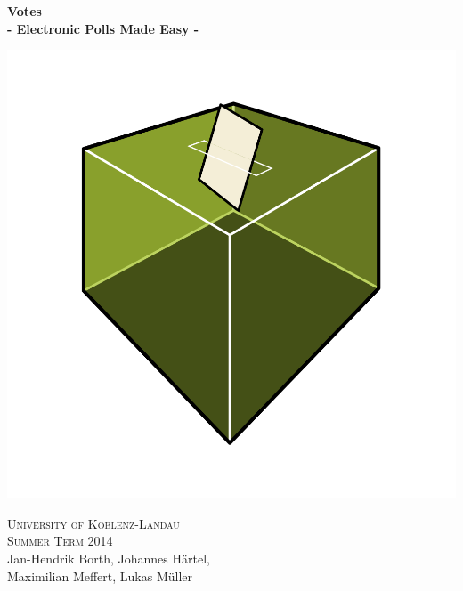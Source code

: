 \documentclass[a4paper]{article}
\begin{document}
\begin{titlepage}

\centering


{\Huge\fontsize{40}{40} \textbf{Votes}}
\\ \vspace*{7mm}
{\LARGE \textbf{- Electronic Polls Made Easy -}}
\\ \vspace*{3mm}

\includegraphics[width=\textwidth]{votes.png}

{\huge \textsc{University of Koblenz-Landau}}
\\ \vspace*{3mm}
{\Large \textsc{Summer Term 2014}}
\\ \vspace*{7mm}
{\large
Jan-Hendrik Borth,
Johannes Härtel,\\
Maximilian Meffert, 
Lukas Müller 
}

\end{titlepage}

\newpage
\vspace*{\fill}
\newpage

\newpage
\tableofcontents
\newpage
\listoffigures
\newpage



\appendix



{
	\footnotesize
	
	
}
\end{document}
